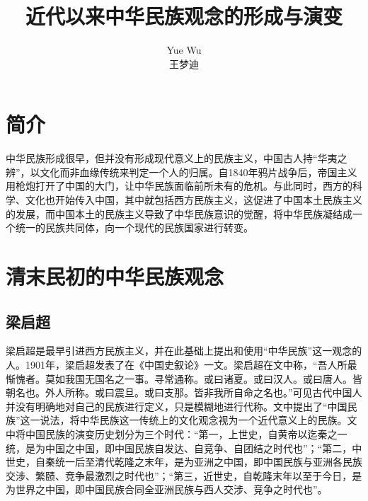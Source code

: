 \documentclass{sig-alternate-05-2015}
\begin{document}

\title{近代以来中华民族观念的形成与演变}

\author{
	\alignauthor
	Yue Wu\titlenote\\
	王梦迪\titlenote\\
}

\maketitle




\section{简介}

	中华民族形成很早，但并没有形成现代意义上的民族主义，中国古人持“华夷之辨”，以文化而非血缘传统来判定一个人的归属。自1840年鸦片战争后，帝国主义用枪炮打开了中国的大门，让中华民族面临前所未有的危机。与此同时，西方的科学、文化也开始传入中国，其中就包括西方民族主义，这促进了中国本土民族主义的发展，而中国本土的民族主义导致了中华民族意识的觉醒，将中华民族凝结成一个统一的民族共同体，向一个现代的民族国家进行转变。


\section{清末民初的中华民族观念}

\subsection{梁启超}
梁启超是最早引进西方民族主义，并在此基础上提出和使用“中华民族”这一观念的人。1901年，梁启超发表了在《中国史叙论》一文。梁启超在文中称，“吾人所最惭愧者。莫如我国无国名之一事。寻常通称。或曰诸夏。或曰汉人。或曰唐人。皆朝名也。外人所称。或曰震旦。或曰支那。皆非我所自命之名也。”可见古代中国人并没有明确地对自己的民族进行定义，只是模糊地进行代称。文中提出了“中国民族”这一说法，将中华民族这一传统上的文化观念视为一个近代意义上的民族。文中将中国民族的演变历史划分为三个时代：“第一，上世史，自黄帝以迄秦之一统，是为中国之中国，即中国民族自发达、自竞争、自团结之时代也”；“第二，中世史，自秦统一后至清代乾隆之末年，是为亚洲之中国，即中国民族与亚洲各民族交涉、繁赜、竞争最激烈之时代也”；“第三，近世史，自乾隆末年以至于今日，是为世界之中国，即中国民族合同全亚洲民族与西人交涉、竞争之时代也”。
\end{document}
